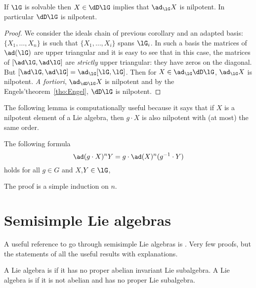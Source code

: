 \begin{corollary}
	If $\lG$ is solvable then $X\in\dD\lG$ implies that $\ad_{\lG}X$ is nilpotent. In particular $\dD\lG$ is nilpotent.
\end{corollary}

\begin{proof}
	We consider the ideals chain of previous corollary and an adapted basis: $\{X_1,\ldots,X_n\}$ is such that $\{X_1,\ldots,X_i\}$ spans $\lG_i$. In such a basis the matrices of $\ad(\lG)$ are upper triangular and it is easy to see that in this case, the matrices of $[\ad\lG,\ad\lG]$ are \emph{strictly} upper triangular: they have zeros on the diagonal. But $[\ad\lG,\ad\lG]=\ad_{\lG}[\lG,\lG]$. Then for $X\in\ad_{\lG}\dD\lG$, $\ad_{\lG}X$ is nilpotent. \emph{A fortiori}, $\ad_{\dD\lG}X$ is nilpotent and by the Engels'theorem~\ref{tho:Engel}, $\dD\lG$ is nilpotent.
\end{proof}

The following lemma is computationally useful because it says that if $X$ is a nilpotent element of a Lie algebra, then $g\cdot X$ is also nilpotent with (at most) the same order.

\begin{lemma}
	The following formula
	\begin{equation}
		\ad(g\cdot X)^nY=g\cdot \ad(X)^n(g^{-1}\cdot Y)
	\end{equation}
	holds for all $g\in G$ and $X$,$Y\in\lG$,
	\label{lem:nil_Ad}
\end{lemma}

The proof is a simple induction on $n$.

\section{Semisimple Lie algebras}

A useful reference to go through semisimple Lie algebras is \cite{Wisser}. Very few proofs, but the statements of all the useful results with explanations.

\begin{definition}
	A Lie algebra is  if it has no proper abelian invariant Lie subalgebra. A Lie algebra is  if it is not abelian and has no proper Lie subalgebra.
\end{definition}

